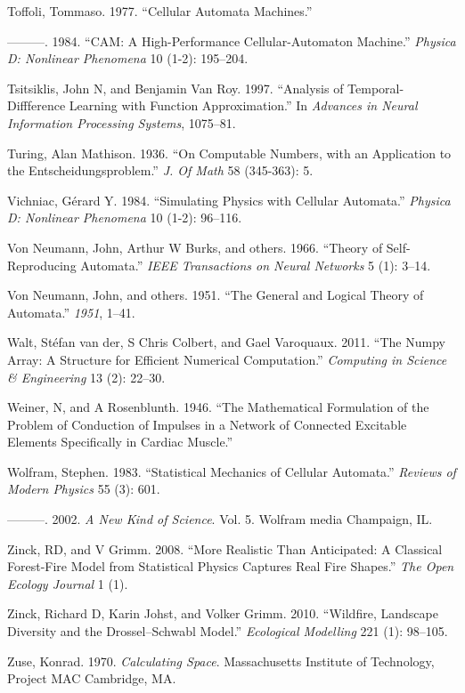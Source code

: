 \documentclass[
  12pt,
  openany]{book}
\newlength{\cslhangindent}
\newenvironment{cslreferences}%
  {\setlength{\parindent}{0pt}%
  \everypar{\setlength{\hangindent}{\cslhangindent}}\ignorespaces}%
  {\par}
\begin{document}
\begin{cslreferences}
\leavevmode\hypertarget{ref-toffoli1977cellular}{}%
Toffoli, Tommaso. 1977. ``Cellular Automata Machines.''

\leavevmode\hypertarget{ref-toffoli1984cam}{}%
---------. 1984. ``CAM: A High-Performance Cellular-Automaton Machine.'' \emph{Physica D: Nonlinear Phenomena} 10 (1-2): 195--204.

\leavevmode\hypertarget{ref-tsitsiklis1997analysis}{}%
Tsitsiklis, John N, and Benjamin Van Roy. 1997. ``Analysis of Temporal-Diffference Learning with Function Approximation.'' In \emph{Advances in Neural Information Processing Systems}, 1075--81.

\leavevmode\hypertarget{ref-turing1936computable}{}%
Turing, Alan Mathison. 1936. ``On Computable Numbers, with an Application to the Entscheidungsproblem.'' \emph{J. Of Math} 58 (345-363): 5.

\leavevmode\hypertarget{ref-vichniac1984simulating}{}%
Vichniac, Gérard Y. 1984. ``Simulating Physics with Cellular Automata.'' \emph{Physica D: Nonlinear Phenomena} 10 (1-2): 96--116.

\leavevmode\hypertarget{ref-von1966theory}{}%
Von Neumann, John, Arthur W Burks, and others. 1966. ``Theory of Self-Reproducing Automata.'' \emph{IEEE Transactions on Neural Networks} 5 (1): 3--14.

\leavevmode\hypertarget{ref-von1951general}{}%
Von Neumann, John, and others. 1951. ``The General and Logical Theory of Automata.'' \emph{1951}, 1--41.

\leavevmode\hypertarget{ref-walt2011numpy}{}%
Walt, Stéfan van der, S Chris Colbert, and Gael Varoquaux. 2011. ``The Numpy Array: A Structure for Efficient Numerical Computation.'' \emph{Computing in Science \& Engineering} 13 (2): 22--30.

\leavevmode\hypertarget{ref-weiner1946mathematical}{}%
Weiner, N, and A Rosenblunth. 1946. ``The Mathematical Formulation of the Problem of Conduction of Impulses in a Network of Connected Excitable Elements Specifically in Cardiac Muscle.''

\leavevmode\hypertarget{ref-wolfram1983statistical}{}%
Wolfram, Stephen. 1983. ``Statistical Mechanics of Cellular Automata.'' \emph{Reviews of Modern Physics} 55 (3): 601.

\leavevmode\hypertarget{ref-wolfram2002new}{}%
---------. 2002. \emph{A New Kind of Science}. Vol. 5. Wolfram media Champaign, IL.

\leavevmode\hypertarget{ref-zinck2008more}{}%
Zinck, RD, and V Grimm. 2008. ``More Realistic Than Anticipated: A Classical Forest-Fire Model from Statistical Physics Captures Real Fire Shapes.'' \emph{The Open Ecology Journal} 1 (1).

\leavevmode\hypertarget{ref-zinck2010wildfire}{}%
Zinck, Richard D, Karin Johst, and Volker Grimm. 2010. ``Wildfire, Landscape Diversity and the Drossel--Schwabl Model.'' \emph{Ecological Modelling} 221 (1): 98--105.

\leavevmode\hypertarget{ref-zuse1970calculating}{}%
Zuse, Konrad. 1970. \emph{Calculating Space}. Massachusetts Institute of Technology, Project MAC Cambridge, MA.
\end{cslreferences}
\end{document}
